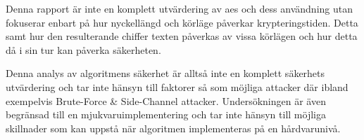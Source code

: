Denna rapport är inte en komplett utvärdering av \acrshort{aes} och dess användning utan fokuserar
enbart på hur nyckellängd och körläge påverkar krypteringstiden. Detta samt hur den resulterande
chiffer texten påverkas av vissa körlägen och hur detta då i sin tur kan påverka säkerheten. \par

Denna analys av algoritmens säkerhet är alltså inte en komplett säkerhets utvärdering och tar inte
hänsyn till faktorer så som möjliga attacker där ibland exempelvis Brute-Force
\& Side-Channel attacker. Undersökningen är även
begränsad till en mjukvaruimplementering och tar inte hänsyn till möjliga skillnader som kan uppstå
när algoritmen implementeras på en hårdvarunivå.